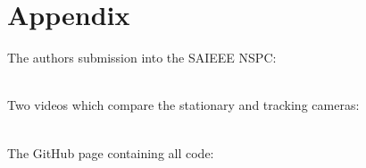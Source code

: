 \documentclass[a4paper,12pt]{report}
\begin{document}
{\chapter{Appendix}
The authors submission into the SAIEEE NSPC:

\href{https://www.youtube.com/watch?v=NjCOmwhG3zo}{}
\\

Two videos which compare the stationary and tracking cameras:

\href{https://youtu.be/Oea_mKTjV5U}{}
\\

The GitHub page containing all code:

\href{https://github.com/alknemeyer/EEE4022S-Thesis-Project}{}


\newpage


%


}
\end{document}
